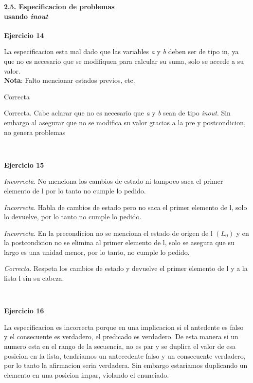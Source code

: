 \documentclass{article}
\begin{document}
\noindent\huge{\textbf{2.5. Especificacion de problemas \\usando \textit{inout}}\\\\
\LARGE{\textbf{Ejercicio 14}}\\
\begin{itemize}\Large{
    \item [a) ] La especificacion esta mal dado que las variables \textit{a} y \textit{b} deben ser de tipo in, ya que no es necesario que se modifiquen para calcular su suma, solo se accede a su valor.\\
    \textbf{Nota}: Falto mencionar estados previos, etc.\\
    \item[b) ]  Correcta\\
    \item [c) ] Correcta. Cabe aclarar que no es necesario que \textit{a} y \textit{b} sean de tipo \textit{inout}. Sin embargo al asegurar que no se modifica su valor gracias a la pre y postcondicion, no genera problemas}\\
\end{itemize}
\LARGE{\textbf{Ejercicio 15}}\\
\begin{itemize}\Large{
    \item [a) ] \textit{Incorrecta}. No menciona los cambios de estado ni tampoco saca el primer elemento de l por lo tanto no cumple lo pedido.
    \item[b) ]  \textit{Incorrecta}. Habla de cambios de estado pero no saca el primer elemento de l, solo lo devuelve, por lo tanto no cumple lo pedido.
    \item[c) ] \textit{Incorrecta}. En la precondicion no se menciona el estado de origen de l $(L_0)$ y en la postcondicion no se elimina al primer elemento de l, solo se asegura que su largo es una unidad menor, por lo tanto, no cumple lo pedido.
    \item [d) ] \textit{Correcta}. Respeta los cambios de estado y devuelve el primer elemento de l y a la lista l sin su cabeza.}\\
\end{itemize}
\LARGE{\textbf{Ejercicio 16}}\\
\begin{itemize}\Large{
    \item [a) ] La especificacion es incorrecta porque en una implicacion si el antedente es falso y el consecuente es verdadero, el predicado es verdadero. De esta manera si un numero esta en el rango de la secuencia, no es par y se duplica el valor de esa posicion en la lista, tendriamos un antecedente falso y un consecuente verdadero, por lo tanto la afirmacion seria verdadera. Sin embargo estariamos duplicando un elemento en una posicion impar, violando el enunciado.
}
\end{itemize}}
\end{document}
